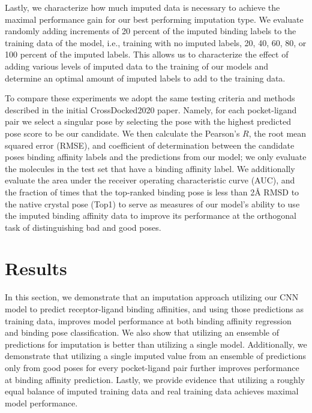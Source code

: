 \documentclass[journal=jcim,manuscript=article]{achemso}
\begin{document}
Lastly, we characterize how much imputed data is necessary to achieve the maximal performance gain for our best performing imputation type.
We evaluate randomly adding increments of 20 percent of the imputed binding labels to the training data of the model, i.e., training with no imputed labels, 20, 40, 60, 80, or 100 percent of the imputed labels.
This allows us to characterize the effect of adding various levels of imputed data to the training of our models and determine an optimal amount of imputed labels to add to the training data.

To compare these experiments we adopt the same testing criteria and methods described in the initial CrossDocked2020 paper\cite{crossdocked2020}.
Namely, for each pocket-ligand pair we select a singular pose by selecting the pose with the highest predicted pose score to be our candidate. 
We then calculate the Pearson's $R$, the root mean squared error (RMSE), and coefficient of determination between the candidate poses binding affinity labels and the predictions from our model; we only evaluate the molecules in the test set that have a binding affinity label.
We additionally evaluate the area under the receiver operating characteristic curve (AUC), and the fraction of times that the top-ranked binding pose is less than 2{\AA} RMSD to the native crystal pose (Top1) to serve as measures of our model's ability to use the imputed binding affinity data to improve its performance at the orthogonal task of distinguishing bad and good poses.

\section{Results}
In this section, we demonstrate that an imputation approach utilizing our CNN model to predict receptor-ligand binding affinities, and using those predictions as training data, improves model performance at both binding affinity regression and binding pose classification.
We also show that utilizing an ensemble of predictions for imputation is better than utilizing a single model.
Additionally, we demonstrate that utilizing a single imputed value from an ensemble of predictions only from good poses for every pocket-ligand pair further improves performance at binding affinity prediction.
Lastly, we provide evidence that utilizing a roughly equal balance of imputed training data and real training data achieves maximal model performance.
\end{document}
